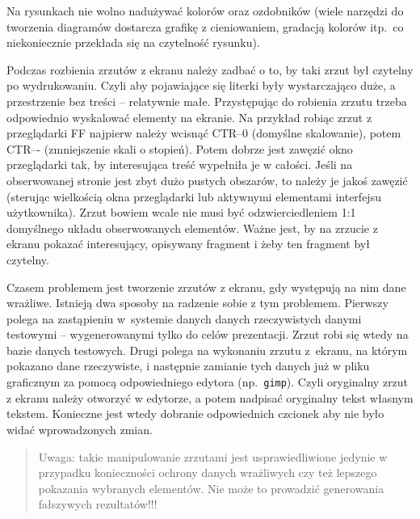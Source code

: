 Na rysunkach nie wolno nadużywać kolorów oraz ozdobników (wiele narzędzi do tworzenia diagramów dostarcza grafikę z cieniowaniem, gradacją kolorów itp.\  co niekoniecznie przekłada się na czytelność rysunku).

Podczas rozbienia zrzutów z ekranu należy zadbać o to, by taki zrzut był czytelny po wydrukowaniu. Czyli aby pojawiające się literki były wystarczająco duże, a przestrzenie bez treści -- relatywnie małe.
Przystępując do robienia zrzutu trzeba odpowiednio wyskalować elementy na ekranie. Na przykład robiąc zrzut z przeglądarki FF najpierw należy wcisnąć CTR--0 (domyślne skalowanie), potem CTR--{}- (zmniejszenie skali o stopień). Potem dobrze jest zawęzić okno przeglądarki tak, by interesująca treść wypełniła je w całości. Jeśli na obserwowanej stronie jest zbyt dużo pustych obszarów, to należy je jakoś zawęzić (sterując wielkością okna przeglądarki lub aktywnymi elementami interfejsu użytkownika). Zrzut bowiem wcale nie musi być odzwierciedleniem 1:1 domyślnego układu obserwowanych elementów. Ważne jest, by na zrzucie z ekranu pokazać interesujący, opisywany fragment i żeby ten fragment był czytelny.
	
Czasem problemem jest tworzenie zrzutów z ekranu, gdy występują na nim dane wrażliwe. Istnieją dwa sposoby na radzenie sobie z tym problemem.
Pierwszy polega na zastąpieniu w~systemie danych danych rzeczywistych danymi testowymi -- wygenerowanymi tylko do celów prezentacji.
Zrzut robi się wtedy na bazie danych testowych.
Drugi polega na wykonaniu zrzutu z~ekranu, na którym pokazano dane rzeczywiste, i następnie zamianie tych danych już w pliku graficznym
za pomocą odpowiedniego edytora (np.~\texttt{gimp}). Czyli oryginalny zrzut z ekranu należy otworzyć w edytorze, a potem
nadpisać oryginalny tekst własnym tekstem. Konieczne jest wtedy dobranie odpowiednich czcionek aby nie było widać
wprowadzonych zmian. 
\begin{quotation}
Uwaga: takie manipulowanie zrzutami jest usprawiedliwione jedynie w przypadku konieczności ochrony danych wrażliwych czy też lepszego pokazania wybranych elementów. Nie może to prowadzić generowania fałszywych rezultatów!!!
\end{quotation}

